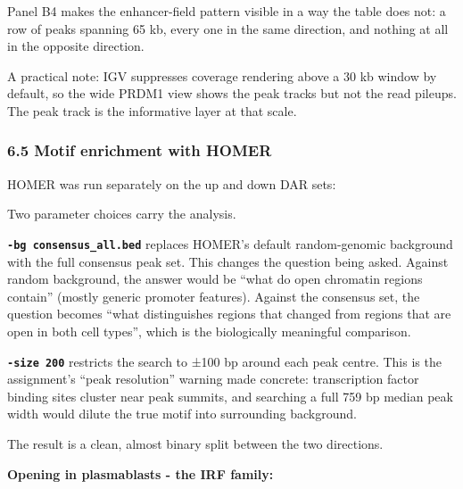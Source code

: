 \documentclass[
  11pt,
  a4paper,
]{article}
\newenvironment{Shaded}{}{}
\newcommand{\AttributeTok}[1]{\textcolor[rgb]{0.49,0.56,0.16}{#1}}
\newcommand{\DataTypeTok}[1]{\textcolor[rgb]{0.56,0.13,0.00}{#1}}
\newcommand{\ExtensionTok}[1]{#1}
\newcommand{\NormalTok}[1]{#1}
\newcommand{\VariableTok}[1]{\textcolor[rgb]{0.10,0.09,0.49}{#1}}
\begin{document}
Panel B4 makes the enhancer-field pattern visible in a way the table
does not: a row of peaks spanning 65 kb, every one in the same
direction, and nothing at all in the opposite direction.

A practical note: IGV suppresses coverage rendering above a 30 kb window
by default, so the wide PRDM1 view shows the peak tracks but not the
read pileups. The peak track is the informative layer at that scale.

\hypertarget{motif-enrichment-with-homer}{%
\subsubsection{6.5 Motif enrichment with
HOMER}\label{motif-enrichment-with-homer}}

HOMER was run separately on the up and down DAR sets:

\begin{Shaded}
\end{Shaded}

Two parameter choices carry the analysis.

\textbf{\texttt{-bg\ consensus\_all.bed}} replaces HOMER's default
random-genomic background with the full consensus peak set. This changes
the question being asked. Against random background, the answer would be
``what do open chromatin regions contain'' (mostly generic promoter
features). Against the consensus set, the question becomes ``what
distinguishes regions that changed from regions that are open in both
cell types'', which is the biologically meaningful comparison.

\textbf{\texttt{-size\ 200}} restricts the search to ±100 bp around each
peak centre. This is the assignment's ``peak resolution'' warning made
concrete: transcription factor binding sites cluster near peak summits,
and searching a full 759 bp median peak width would dilute the true
motif into surrounding background.

The result is a clean, almost binary split between the two directions.

\textbf{Opening in plasmablasts - the IRF family:}
\end{document}
